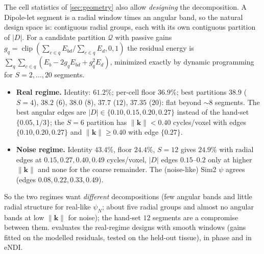 \documentclass[11pt]{article}
\newcommand{\bk}{\bm{k}}
\newcommand{\norm}[1]{\lVert #1\rVert}
\newcommand{\abs}[1]{\lvert #1\rvert}
\DeclareMathOperator{\clip}{clip}
\begin{document}
The cell statistics of \cref{sec:geometry} also allow \emph{designing} the decomposition. A Dipole-let segment is a radial window times an angular band, so the natural design space is: contiguous radial groups, each with its own contiguous partition of $\abs D$. For a candidate partition $\mathcal Q$ with passive gains $g_q=\clip(\sum_{c\in q}E_{bd}/\sum_{c\in q}E_d,0,1)$ the residual energy is $\sum_q\sum_{c\in q}(E_b-2g_qE_{bd}+g_q^2E_d)$, minimized exactly by dynamic programming for $S=2,\dots,20$ segments.
\begin{itemize}[leftmargin=1.5em,itemsep=1pt]
\item \textbf{Real regime.} Identity: $61.2\%$; per-cell floor $36.9\%$; best partitions $38.9$ ($S=4$), $38.2$ ($6$), $38.0$ ($8$), $37.7$ ($12$), $37.35$ ($20$): flat beyond $\sim8$ segments. The best angular edges are $\abs D\in\{0.10,0.15,0.20,0.27\}$ instead of the hand-set $\{0.05,1/3\}$; the $S=6$ partition has $\norm\bk<0.40$ cycles/voxel with edges $\{0.10,0.20,0.27\}$ and $\norm\bk\ge0.40$ with edge $\{0.27\}$.
\item \textbf{Noise regime.} Identity $43.4\%$, floor $24.4\%$, $S=12$ gives $24.9\%$ with radial edges at $0.15,0.27,0.40,0.49$ cycles/voxel, $\abs D$ edges $0.15$--$0.2$ only at higher $\norm\bk$ and none for the coarse remainder. The (noise-like) Sim2 $\psi$ agrees (edges $0.08,0.22,0.33,0.49$).
\end{itemize}
So the two regimes want \emph{different} decompositions (few angular bands and little radial structure for real-like $\psi_N$; about five radial groups and almost no angular bands at low $\norm\bk$ for noise); the hand-set $12$ segments are a compromise between them.  evaluates the real-regime designs with smooth windows (gains fitted on the modelled residuals, tested on the held-out tissue), in phase and in eNDI.
\end{document}
